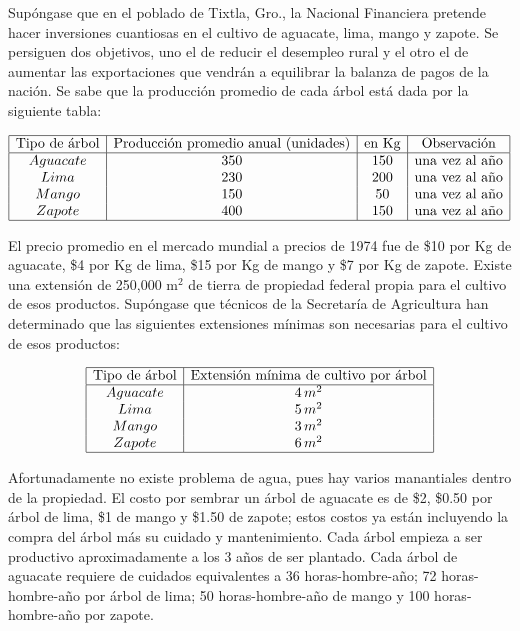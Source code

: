 \begin{Ejer}
Sup\'ongase que en el poblado de Tixtla, Gro., la Nacional Financiera pretende hacer inversiones cuantiosas en el cultivo de aguacate, lima, mango y zapote. Se persiguen dos objetivos, uno el de reducir el desempleo rural y el otro el de aumentar las exportaciones que vendr\'an a equilibrar la balanza de pagos de la naci\'on. Se sabe que la producci\'on promedio de cada \'arbol est\'a dada por la siguiente tabla:

\[
\begin{array}{|c|c|c|c|}
\hline
\text{Tipo de \'arbol} & \text{Producci\'on promedio anual (unidades)} & \text{en Kg} & \text{Observaci\'on} \\
\hline
Aguacate & 350 & 150 & \text{una vez al a\~no} \\
Lima & 230 & 200 & \text{una vez al a\~no} \\
Mango & 150 & 50 & \text{una vez al a\~no} \\
Zapote & 400 & 150 & \text{una vez al a\~no} \\
\hline
\end{array}
\]

El precio promedio en el mercado mundial a precios de 1974 fue de \$10 por Kg de aguacate, \$4 por Kg de lima, \$15 por Kg de mango y \$7 por Kg de zapote. Existe una extensi\'on de 250,000 m$^2$ de tierra de propiedad federal propia para el cultivo de esos productos. Sup\'ongase que t\'ecnicos de la Secretar\'ia de Agricultura han determinado que las siguientes extensiones m\'inimas son necesarias para el cultivo de esos productos:

\[
\begin{array}{|c|c|}
\hline
\text{Tipo de \'arbol} & \text{Extensi\'on m\'inima de cultivo por \'arbol} \\
\hline
Aguacate & 4\,m^2 \\
Lima & 5\,m^2 \\
Mango & 3\,m^2 \\
Zapote & 6\,m^2 \\
\hline
\end{array}
\]

Afortunadamente no existe problema de agua, pues hay varios manantiales dentro de la propiedad. El costo por sembrar un \'arbol de aguacate es de \$2, \$0.50 por \'arbol de lima, \$1 de mango y \$1.50 de zapote; estos costos ya est\'an incluyendo la compra del \'arbol m\'as su cuidado y mantenimiento. Cada \'arbol empieza a ser productivo aproximadamente a los 3 a\~nos de ser plantado. Cada \'arbol de aguacate requiere de cuidados equivalentes a 36 horas-hombre-a\~no; 72 horas-hombre-a\~no por \'arbol de lima; 50 horas-hombre-a\~no de mango y 100 horas-hombre-a\~no por zapote.


\end{Ejer}
